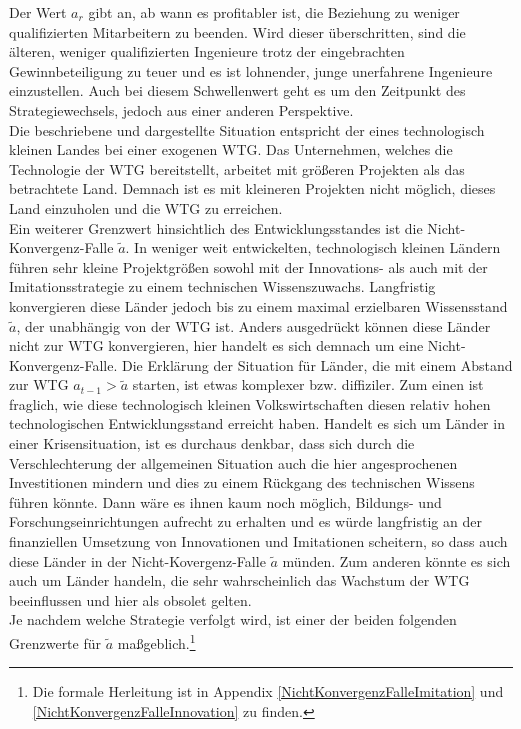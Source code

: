 Der Wert $a_r$ gibt an, ab wann es profitabler ist, die Beziehung zu weniger qualifizierten Mitarbeitern zu beenden. Wird dieser überschritten, sind die älteren, weniger qualifizierten Ingenieure trotz der eingebrachten Gewinnbeteiligung zu teuer und es ist lohnender, junge unerfahrene Ingenieure einzustellen. Auch bei diesem Schwellenwert geht es um den Zeitpunkt des Strategiewechsels, jedoch aus einer anderen Perspektive.\\
Die beschriebene und dargestellte Situation entspricht der eines technologisch kleinen Landes bei einer exogenen WTG. Das Unternehmen, welches die Technologie der WTG bereitstellt, arbeitet mit grö{\ss}eren Projekten als das betrachtete Land. Demnach ist es mit kleineren Projekten nicht möglich, dieses Land einzuholen und die WTG zu erreichen.\\ Ein weiterer Grenzwert hinsichtlich des Entwicklungsstandes ist die Nicht-Konvergenz-Falle $\tilde{a}$. In weniger weit entwickelten, technologisch kleinen Ländern führen sehr kleine Projektgrö{\ss}en sowohl mit der Innovations- als auch mit der Imitationsstrategie zu einem technischen Wissenszuwachs. Langfristig konvergieren diese Länder jedoch bis zu einem maximal erzielbaren Wissensstand $\tilde{a}$, der unabhängig von der WTG ist. Anders ausgedrückt können diese Länder nicht zur WTG konvergieren, hier handelt es sich demnach um eine Nicht-Konvergenz-Falle. 
Die Erklärung der Situation für Länder, die mit einem Abstand zur WTG $a_{t-1}>\tilde{a}$ starten, ist etwas komplexer bzw. diffiziler. Zum einen ist fraglich, wie diese technologisch kleinen Volkswirtschaften diesen relativ hohen technologischen Entwicklungsstand erreicht haben. Handelt es sich um Länder in einer Krisensituation, ist es durchaus denkbar, dass sich durch die Verschlechterung der allgemeinen Situation auch die hier angesprochenen Investitionen mindern und dies zu einem Rückgang des technischen Wissens führen könnte. Dann wäre es ihnen kaum noch möglich, Bildungs- und Forschungseinrichtungen aufrecht zu erhalten und es würde  langfristig an der finanziellen Umsetzung von Innovationen und Imitationen scheitern, so dass auch diese Länder in der Nicht-Kovergenz-Falle $\tilde{a}$ münden. Zum anderen könnte es sich auch um Länder handeln, die sehr wahrscheinlich das Wachstum der WTG beeinflussen und hier als obsolet gelten.\\
Je nachdem welche Strategie verfolgt wird, ist einer der beiden folgenden Grenzwerte für $\tilde{a}$ ma{\ss}geblich.\footnote{Die formale Herleitung ist in Appendix \ref{NichtKonvergenzFalleImitation} und \ref{NichtKonvergenzFalleInnovation} zu finden.}


